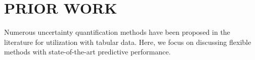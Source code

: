\section{PRIOR WORK}






Numerous uncertainty quantification methods have been proposed in the literature for utilization with tabular data. Here, we focus on discussing flexible methods with state-of-the-art predictive performance.

